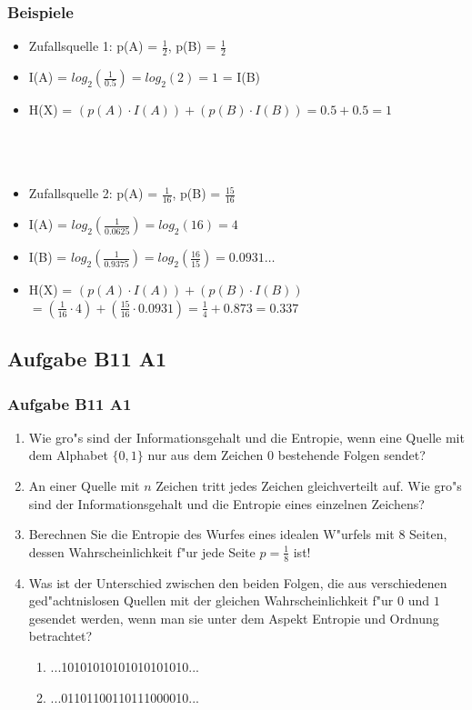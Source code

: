 \begin{frame}
	\frametitle{Beispiele}
	\begin{itemize}
		\item Zufallsquelle 1: p(A) = $\frac{1}{2}$, p(B) = $\frac{1}{2}$
		\item I(A) = $log_2(\frac{1}{0.5}) = log_2(2) = 1$ = I(B)
		\item H(X) = $(p(A) \cdot I(A)) + (p(B) \cdot I(B)) = 0.5 + 0.5 = 1$~\\~\\~\\~\\
		\item Zufallsquelle 2: p(A) = $\frac{1}{16}$, p(B) = $\frac{15}{16}$
		\item I(A) = $log_2(\frac{1}{0.0625}) = log_2(16) = 4$
		\item I(B) = $log_2(\frac{1}{0.9375}) = log_2(\frac{16}{15}) = 0.0931\ldots$
		\item H(X) = $(p(A) \cdot I(A)) + (p(B) \cdot I(B))$~\\$= (\frac{1}{16} \cdot 4) + (\frac{15}{16} \cdot 0.0931) = \frac{1}{4} + 0.873 = 0.337$
	\end{itemize}
\end{frame}

\subsection{Aufgabe B11 A1}
\begin{frame}
	\frametitle{Aufgabe B11 A1}
	\begin{enumerate}
		\item Wie gro"s sind der Informationsgehalt und die Entropie, wenn eine Quelle mit
		dem Alphabet $\{0,1\}$ nur aus dem Zeichen $0$ bestehende Folgen sendet?
		\item An einer Quelle mit $n$ Zeichen tritt jedes Zeichen gleichverteilt auf. Wie
		gro"s sind der Informationsgehalt und die Entropie eines einzelnen Zeichens?
		\item Berechnen Sie die Entropie des Wurfes eines idealen W"urfels mit 8 Seiten,
		dessen Wahrscheinlichkeit f"ur jede Seite $p = \frac{1}{8}$ ist!
		\item Was ist der Unterschied zwischen den beiden Folgen, die aus verschiedenen
		ged"achtnislosen Quellen mit der gleichen Wahrscheinlichkeit f"ur $0$ und $1$
		gesendet werden, wenn man sie unter dem Aspekt Entropie und Ordnung betrachtet?
		\begin{enumerate}
			\item ...10101010101010101010...
			\item ...01101100110111000010...
		\end{enumerate}
	\end{enumerate}
\end{frame}

